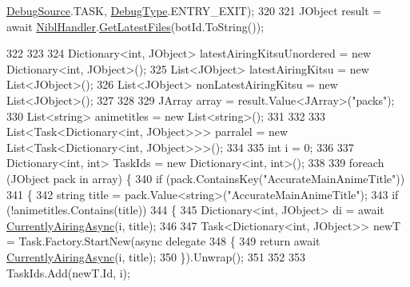 \begin{DoxyCode}
      \mbox{\hyperlink{namespace_little_weeb_library_1_1_handlers_a2a6ca0775121c9c503d58aa254d292be}{DebugSource}}.TASK, \mbox{\hyperlink{namespace_little_weeb_library_1_1_handlers_ab66019ed40462876ec4e61bb3ccb0a62}{DebugType}}.ENTRY\_EXIT);
320 
321             JObject result = await \mbox{\hyperlink{class_little_weeb_library_1_1_handlers_1_1_anime_profile_handler_a4bba317e1a7ee70ecc0d7e108787d399}{NiblHandler}}.\mbox{\hyperlink{interface_little_weeb_library_1_1_handlers_1_1_i_nibl_handler_a744548c45993c925a492744f1fb747e9}{GetLatestFiles}}(botId.ToString());  
             
322 
323 
324             Dictionary<int, JObject> latestAiringKitsuUnordered = \textcolor{keyword}{new} Dictionary<int, JObject>();
325             List<JObject> latestAiringKitsu = \textcolor{keyword}{new} List<JObject>();
326             List<JObject> nonLatestAiringKitsu = \textcolor{keyword}{new} List<JObject>();
327 
328 
329             JArray array = result.Value<JArray>(\textcolor{stringliteral}{"packs"});
330             List<string> animetitles = \textcolor{keyword}{new} List<string>();
331 
332 
333             List<Task<Dictionary<int, JObject>>> parralel = \textcolor{keyword}{new} List<Task<Dictionary<int, JObject>>>();
334 
335             \textcolor{keywordtype}{int} i = 0;
336 
337             Dictionary<int, int> TaskIds = \textcolor{keyword}{new} Dictionary<int, int>();
338 
339             \textcolor{keywordflow}{foreach} (JObject pack \textcolor{keywordflow}{in} array) \{
340                 \textcolor{keywordflow}{if} (pack.ContainsKey(\textcolor{stringliteral}{"AccurateMainAnimeTitle"}))
341                 \{
342                     \textcolor{keywordtype}{string} title = pack.Value<\textcolor{keywordtype}{string}>(\textcolor{stringliteral}{"AccurateMainAnimeTitle"});
343                     \textcolor{keywordflow}{if} (!animetitles.Contains(title))
344                     \{
345                         Dictionary<int, JObject> di = await \mbox{\hyperlink{class_little_weeb_library_1_1_handlers_1_1_anime_profile_handler_a11b3560a1e2fe0e3ac5d481efb46d7a6}{CurrentlyAiringAsync}}(i, 
      title);
346 
347                         Task<Dictionary<int, JObject>> newT = Task.Factory.StartNew(async delegate
348                         \{
349                             \textcolor{keywordflow}{return} await \mbox{\hyperlink{class_little_weeb_library_1_1_handlers_1_1_anime_profile_handler_a11b3560a1e2fe0e3ac5d481efb46d7a6}{CurrentlyAiringAsync}}(i, title);
350                         \}).Unwrap();
351 
352 
353                         TaskIds.Add(newT.Id, i);

\end{DoxyCode}
